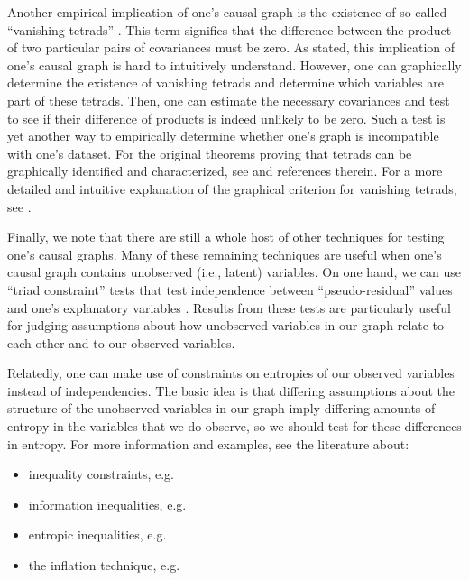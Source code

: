 Another empirical implication of one's causal graph is the existence of so-called ``vanishing tetrads'' \citep{spearman_1904_general}.
This term signifies that the difference between the product of two particular pairs of covariances must be zero.
As stated, this implication of one's causal graph is hard to intuitively understand.
However, one can graphically determine the existence of vanishing tetrads and determine which variables are part of these tetrads.
Then, one can estimate the necessary covariances and test to see if their difference of products is indeed unlikely to be zero.
Such a test is yet another way to empirically determine whether one's graph is incompatible with one's dataset.
For the original theorems proving that tetrads can be graphically identified and characterized, see \citet{shafer_1996_vanishing} and references therein.
For a more detailed and intuitive explanation of the graphical criterion for vanishing tetrads, see \citet{thoemmes_2018_local}.

Finally, we note that there are still a whole host of other techniques for testing one's causal graphs.
Many of these remaining techniques are useful when one's causal graph contains unobserved (i.e., latent) variables.
On one hand, we can use ``triad constraint'' tests that test independence between ``pseudo-residual'' values and one's explanatory variables \citep{cai_2019_triad}.
Results from these tests are particularly useful for judging assumptions about how unobserved variables in our graph relate to each other and to our observed variables.

Relatedly, one can make use of constraints on entropies of our observed variables instead of independencies.
The basic idea is that differing assumptions about the structure of the unobserved variables in our graph imply differing amounts of entropy in the variables that we do observe, so we should test for these differences in entropy.
For more information and examples, see the literature about:
\begin{itemize}
  \item inequality constraints, e.g. \citet{tian_2002_testable, kang_2006_inequality, ver_2011_sequence}
  \item information inequalities, e.g. \citet{chaves_2014_inferring}
  \item entropic inequalities, e.g. \citet{chaves_2014_causal}
  \item the inflation technique, e.g. \citet{wolfe_2019_inflation, navascues_2020_inflation}
\end{itemize}
